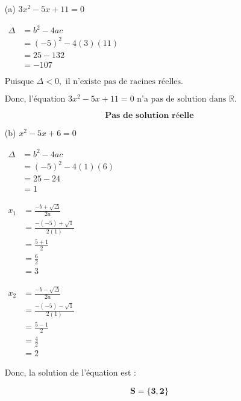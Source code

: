 \documentclass[12pt,a4paper]{article}
\begin{document}
\begin{enumerate}
    \item[(a)] \( 3x^2 - 5x + 11 = 0 \)

\(
\begin{aligned}
\Delta &= b^2 - 4ac \\
       &= (-5)^2 - 4(3)(11) \\
       &= 25 - 132 \\
       &= -107
\end{aligned}
\)

\(
\text{Puisque } \Delta < 0, \text{ il n'existe pas de racines réelles.}
\)

\(
\text{Donc, l'équation } 3x^2 - 5x + 11 = 0 \text{ n'a pas de solution dans } \mathbb{R}.
\)

\begin{tcolorbox}[colback=yellow!20, colframe=black, sharp corners]
    \[
    \mathbf{\text{Pas de solution réelle}}
    \]
\end{tcolorbox}
 
    \item[(b)] \( x^2 - 5x + 6 = 0 \) 


\(
\begin{aligned}
\Delta &= b^2 - 4ac \\
       &= (-5)^2 - 4(1)(6) \\
       &= 25 - 24 \\
       &= 1
\end{aligned}
\)

\(
\begin{aligned}
x_1 &= \frac{-b + \sqrt{\Delta}}{2a} \\
    &= \frac{-(-5) + \sqrt{1}}{2(1)} \\
    &= \frac{5 + 1}{2} \\
    &= \frac{6}{2} \\
    &= 3
\end{aligned}
\)

\(
\begin{aligned}
x_2 &= \frac{-b - \sqrt{\Delta}}{2a} \\
    &= \frac{-(-5) - \sqrt{1}}{2(1)} \\
    &= \frac{5 - 1}{2} \\
    &= \frac{4}{2} \\
    &= 2
\end{aligned}
\)

Donc, la solution de l'équation est :

\begin{tcolorbox}[colback=yellow!20, colframe=black, sharp corners]
    \[
    \mathbf{S = \{ 3, 2 \}}
    \]
\end{tcolorbox}


\end{enumerate}
\end{document}
